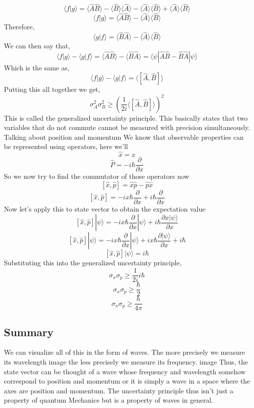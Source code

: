 $$\langle f | g \rangle = \langle \hat{A}\hat{B} \rangle - \langle \hat{B} \rangle \langle \hat{A} \rangle - \langle \hat{A} \rangle \langle \hat{B} \rangle + \langle \hat{A} \rangle \langle \hat{B} \rangle$$
$$\langle f | g \rangle = \langle \hat{A}\hat{B} \rangle - \langle \hat{A} \rangle \langle \hat{B} \rangle$$
Therefore,
$$\langle g | f \rangle = \langle \hat{B}\hat{A} \rangle - \langle \hat{A} \rangle \langle \hat{B} \rangle$$
We can then say that,
$$\langle f | g \rangle - \langle g | f \rangle = \langle \hat{A}\hat{B}\rangle -  \langle \hat{B}\hat{A}\rangle= \langle \psi | \hat{A}\hat{B} - \hat{B}\hat{A} | \psi \rangle$$
Which is the same as,
$$\langle f | g \rangle - \langle g | f \rangle = \langle [\hat{A},\hat{B}] \rangle$$
Putting this all together we get,
$$\sigma^{2}_{A} \sigma^{2}_{B} \geq {\left(\frac{1}{2i}\langle [\hat{A},\hat{B}] \rangle\right)}^{2}$$
This is called the generalized uncertainty principle. This basically states that two variables that do not commute cannot be measured with precision simultaneously. 
Talking about position and momentum
We know that observable properties can be represented using operators, here we'll
$$\hat{x} = x$$
$$\hat{P} = -i\hbar \frac{\partial}{\partial x}$$
So we now try to find the commutator of those operators now
$$[\hat{x}, \hat{p}] = \hat{x}\hat{p} - \hat{p}\hat{x}$$
$$[\hat{x}, \hat{p}] = -ix\hbar \frac{\partial}{\partial x} + i\hbar \frac{\partial}{\partial x}$$
Now let's apply this to state vector to obtain the expectation value 
$$[\hat{x}, \hat{p}] |\psi\rangle = -ix\hbar \frac{\partial}{\partial x} |\psi\rangle + i\hbar \frac{\partial x|\psi\rangle}{\partial x}$$ 
$$[\hat{x}, \hat{p}] |\psi\rangle = -ix\hbar \frac{\partial}{\partial x} |\psi\rangle + ix\hbar \frac{\partial |\psi\rangle}{\partial x} + i\hbar$$
$$[\hat{x}, \hat{p}] |\psi\rangle = i\hbar$$
Substituting this into the generalized uncertainty principle,
$$\sigma_{x}\sigma_{p} \geq \frac{1}{2i} i\hbar$$
$$\sigma_{x}\sigma_{p} \geq \frac{\hbar}{2} $$
$$\sigma_{x}\sigma_{p} \geq \frac{h}{4 \pi}$$
\subsection{Summary}
We can visualize all of this in the form of waves. The more precisely we measure its wavelength
image
the less precisely we measure its frequency.
image
Thus, the state vector can be thought of a wave whose frequency and wavelength somehow correspond to position and momentum or it is simply a wave in a space where the axes are position and momentum. The uncertainty principle thus isn't just a property of quantum Mechanics but is a property of waves in general.
